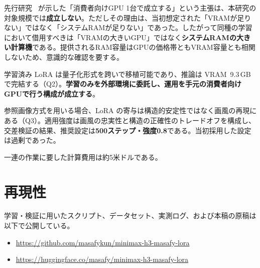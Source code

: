 \documentclass[10pt,twocolumn]{ltjsarticle}
\begin{document}
先行研究~\cite{suzuki2026sd15lora,suzuki2026krea2lora} が示した「消費者向けGPU 1台で成立する」という主張は、本研究の対象規模では\textbf{成立しない}。ただしその理由は、当初想定された「VRAMが足りない」ではなく「システムRAMが足りない」であった。したがって同種の学習において借用すべきは「VRAMの大きいGPU」ではなく\textbf{システムRAMの大きい計算機}である。提供されるRAM容量はGPUの価格帯ともVRAM容量とも相関しないため、意識的な確認を要する。

学習済み LoRA は量子化形式を跨いで移植可能であり、推論は VRAM~9.3\,GB で完結する（Q2）。\textbf{学習のみを外部環境に委託し、運用を手元の消費者向けGPUで行う構成が成立する}。

参照画像方式を用いる場合、LoRA の寄与は構造的安定性ではなく画風の再現にある（Q3）。適用強度は画風の忠実性と構造の正確性のトレードオフを構成し、交差検証の結果、推奨設定は\textbf{500ステップ・強度0.8}である。当初採用した設定は過剰であった。

一連の作業に要した計算費用は約5米ドルである。

\section*{再現性}

学習・検証に用いたスクリプト、データセット、実測ログ、および本稿の原稿は以下で公開している。

\begin{itemize}[leftmargin=1.4em,topsep=2pt,itemsep=0pt]
\item \url{https://github.com/masafykun/minimax-h3-masafy-lora}
\item \url{https://huggingface.co/masafy/minimax-h3-masafy-lora}
\end{itemize}
\end{document}
